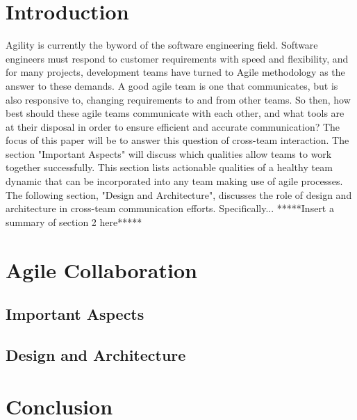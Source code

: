 \documentclass[sigplan,screen]{acmart}
\begin{document}
\section{Introduction}
Agility is currently the byword of the software engineering field. Software engineers must respond to customer requirements with speed and flexibility, and for many projects, development teams have turned to Agile methodology as the answer to these demands. A good agile team is one that communicates, but is also responsive to, changing requirements to and from other teams. So then, how best should these agile teams communicate with each other, and what tools are at their disposal in order to ensure efficient and accurate communication?
The focus of this paper will be to answer this question of cross-team interaction. The section "Important Aspects" will discuss which qualities allow teams to work together successfully. This section lists actionable qualities of a healthy team dynamic that can be incorporated into any team making use of agile processes. The following section, "Design and Architecture", discusses the role of design and architecture in cross-team communication efforts. Specifically... *****Insert a summary of section 2 here*****

\section{Agile Collaboration}

\subsection{Important Aspects}

\subsection{Design and Architecture}

\section{Conclusion}


%


\end{document}
